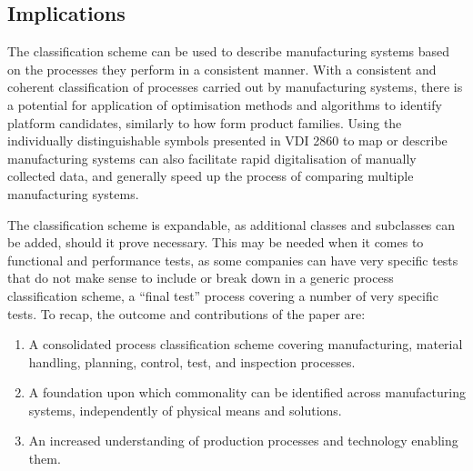 \subsection{Implications}
The classification scheme can be used to describe manufacturing systems based on the processes they perform in a consistent manner.
With a consistent and coherent classification of processes carried out by manufacturing systems, there is a potential for application of optimisation methods and algorithms to identify platform candidates, similarly to how \textcite{Kashkoush20161} form product families.
Using the individually distinguishable symbols presented in VDI 2860 to map or describe manufacturing systems can also facilitate rapid digitalisation of manually collected data, and generally speed up the process of comparing multiple manufacturing systems.

The classification scheme is expandable, as additional classes and subclasses can be added, should it prove necessary.
This may be needed when it comes to functional and performance tests, as some companies can have very specific tests that do not make sense to include or break down in a generic process classification scheme, \eg{} a ``final test'' process covering a number of very specific tests.
To recap, the outcome and contributions of the paper are:
\begin{enumerate}
  \item A consolidated process classification scheme covering manufacturing, material handling, planning, control, test, and inspection processes.
  \item A foundation upon which commonality can be identified across manufacturing systems, independently of physical means and solutions.
  \item An increased understanding of production processes and technology enabling them.
\end{enumerate}